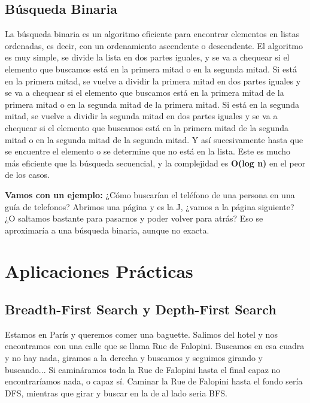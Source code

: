 \documentclass[12pt]{article}
\begin{document}
\subsection{Búsqueda Binaria}
La búsqueda binaria es un algoritmo eficiente para encontrar elementos en listas ordenadas, es decir, con un ordenamiento ascendente o descendente. El algoritmo es muy simple, se divide la lista en dos partes iguales, y se va a chequear si el elemento que buscamos está en la primera mitad o en la segunda mitad. Si está en la primera mitad, se vuelve a dividir la primera mitad en dos partes iguales y se va a chequear si el elemento que buscamos está en la primera mitad de la primera mitad o en la segunda mitad de la primera mitad. Si está en la segunda mitad, se vuelve a dividir la segunda mitad en dos partes iguales y se va a chequear si el elemento que buscamos está en la primera mitad de la segunda mitad o en la segunda mitad de la segunda mitad. Y así sucesivamente hasta que se encuentre el elemento o se determine que no está en la lista. Este es mucho más eficiente que la búsqueda secuencial, y la complejidad es \textbf{O(log n)} en el peor de los casos.

\vspace{0.5em}

\textbf{Vamos con un ejemplo:} ¿Cómo buscarían el teléfono de una persona en una guía de telefonos? Abrimos una página y es la J, ¿vamos a la página siguiente? ¿O saltamos bastante para pasarnos y poder volver para atrás? Eso se aproximaría a una búsqueda binaria, aunque no exacta.

\section{Aplicaciones Prácticas}

\subsection{Breadth-First Search y Depth-First Search}

Estamos en París y queremos comer una baguette. Salimos del hotel y nos encontramos con una calle que se llama Rue de Falopini. Buscamos en esa cuadra y no hay nada, giramos a la derecha y buscamos y seguimos girando y buscando... Si camináramos toda la Rue de Falopini hasta el final capaz no encontraríamos nada, o capaz sí. Caminar la Rue de Falopini hasta el fondo sería DFS, mientras que girar y buscar en la de al lado seria BFS.

\vspace{0.5em}
\end{document}
